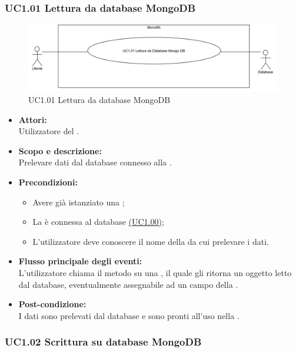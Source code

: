 \subsubsection{UC1.01 Lettura da database MongoDB} \label{UC1.01}

\begin{figure}[H]
	\centering
	\includegraphics[width=15cm]{../../documenti/AnalisiDeiRequisiti/Diagrammi_img/uc1_01.png}
	\caption{UC1.01 Lettura da database MongoDB}
\end{figure}

\begin{itemize}
	\item \textbf{Attori:}
	\\Utilizzatore del .
	\item \textbf{Scopo e descrizione:} 
	\\Prelevare dati dal database connesso alla .
	\item \textbf{Precondizioni:}
	\begin{itemize}
		\item Avere già istanziato una ;
		\item La  è connessa al database  \hyperref[UC1.00]{(UC1.00)};
		\item L'utilizzatore deve conoscere il nome della  da cui prelevare i dati.
	\end{itemize}
	\item \textbf{Flusso principale degli eventi:}
	\\L'utilizzatore chiama il metodo su una , il quale gli ritorna un oggetto  letto dal database, eventualmente assegnabile ad un campo della .
	\item \textbf{Post-condizione:}
	\\I dati sono prelevati dal database e sono pronti all'uso nella .
\end{itemize}

\subsubsection{UC1.02 Scrittura su database MongoDB} \label{UC1.02}

